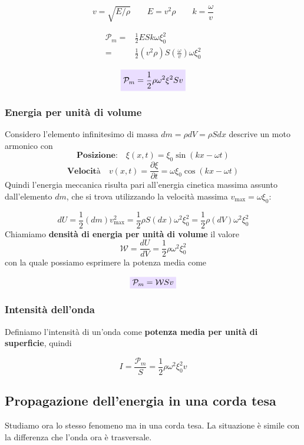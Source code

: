 \documentclass[x11names]{report}
\newcommand{\viola}[1]{\colorbox{yred}{$\displaystyle #1$}}
\begin{document}
	\[ 
	\boxed{v = \sqrt{E/\rho} \qquad E = v^2 \rho} \qquad \boxed{k = \frac{\omega}{v}}
	\]
	
	\begin{align*}
		\mathcal{P}_m =& \frac{1}{2} ESk\omega \xi_0^2  \\
		=& \frac{1}{2} (v^2 \rho)S\left(\frac{\omega}{v}\right) \omega\xi_0^2 
	\end{align*}
	
	\begin{equation}
		\viola{\mathcal{P}_m = \frac{1}{2}\rho \omega^2 \xi^2 S v}
	\end{equation}
	
	
	\subsubsection{Energia per unità di volume}
	Considero l'elemento infinitesimo di massa \(dm = \rho dV = \rho S dx\) descrive un moto armonico con 
	\[ 
	\textbf{Posizione:} \quad \xi(x,t) = \xi_0\sin\left(kx - \omega t\right) 
	\]
	\[ 
	\textbf{Velocità} \quad v(x,t)= \frac{\partial\xi}{\partial t} = \omega \xi_0\cos\left(kx - \omega t\right) 
	\]
	Quindi l'energia meccanica risulta pari all'energia cinetica massima assunto dall'elemento \(dm\), che si trova utilizzando la velocità massima \(v_{\text{max}} = \omega \xi_0\):
	
	\[ 
	dU = \frac{1}{2}(dm)v_{\text{max}}^2 = \frac{1}{2}\rho S (dx)\omega^2 \xi_0^2 = \frac{1}{2}\rho (dV)\omega^2 \xi_0^2
	\]
	Chiamiamo \textbf{densità di energia per unità di volume} il valore 
	\[
	\mathcal{W} = \frac{dU}{dV} = \frac{1}{2}\rho \omega^2\xi_0^2
	\]
	con la quale possiamo esprimere la potenza media come 
	
	\begin{equation}
		\viola{\mathcal{P}_m = \mathcal{W}S v}
	\end{equation}
	
	
	\subsubsection{Intensità dell'onda}
	Definiamo l'intensità di un'onda come  \textbf{potenza media per unità di superficie}, quindi
	
	\[
	I = \frac{\mathcal{P}_m}{S} = \frac{1}{2}\rho\omega^2\xi_0^2v
	\]
	
	\subsection{Propagazione dell'energia in una corda tesa}
	Studiamo ora lo stesso fenomeno ma in una corda tesa. La situazione è simile con la differenza che l'onda ora è trasversale.
	
\end{document}
